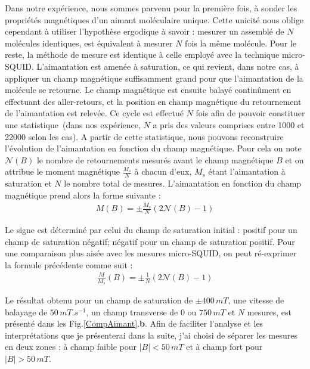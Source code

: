 Dans notre expérience, nous sommes parvenu pour la première fois, à sonder les propriétés magnétiques d'un aimant moléculaire unique. Cette unicité nous oblige cependant à utiliser l'hypothèse ergodique à savoir : mesurer un assemblé de $N$ molécules identiques, est équivalent à mesurer $N$ fois la même molécule. Pour le reste, la méthode de mesure est identique à celle employé avec la technique micro-SQUID. L'aimantation est amenée à saturation, ce qui revient, dans notre cas, à appliquer un champ magnétique suffisamment grand pour que l'aimantation de la molécule se retourne. Le champ magnétique est ensuite balayé continûment en effectuant des aller-retours, et la position en champ magnétique du retournement de l'aimantation est relevée. Ce cycle est effectué $N$ fois afin de pouvoir constituer une statistique~(dans nos expérience, $N$ a pris des valeurs comprises entre 1000 et 22000 selon les cas). A partir de cette statistique, nous pouvons reconstruire l'évolution de l'aimantation en fonction du champ magnétique. Pour cela on note $\mathscr{N}(B)$ le nombre de retournements mesurés avant le champ magnétique $B$ et on attribue le moment magnétique $\frac{M_s}{N}$ à chacun d'eux, $M_s$ étant l'aimantation à saturation et $N$ le nombre total de mesures. L'aimantation en fonction du champ magnétique prend alors la forme suivante :
\begin{eqnarray}
M(B) =\pm \frac{M_s}{N}(2\mathscr{N}(B) -1)\nonumber
\end{eqnarray}

Le signe est déterminé par celui du champ de saturation initial : positif pour un champ de saturation négatif; négatif pour un champ de saturation positif. Pour une comparaison plus aisée avec les mesures micro-SQUID, on peut ré-exprimer la formule précédente comme suit :
\begin{eqnarray}
\frac{M}{M_s}(B) =\pm \frac{1}{N} (2\mathscr{N}(B) -1)
\end{eqnarray}


Le résultat obtenu pour un champ de saturation de $\pm 400 \, mT$, une vitesse de balayage de $50\,mT.s^{-1}$, un champ transverse de $0$ ou $750\,mT$ et $N$ mesures, est présenté dans les Fig.\ref{CompAimant}.\textbf{b}. Afin de faciliter l'analyse et les interprétations que je présenterai dans la suite, j'ai choisi de séparer les mesures en deux zones : à champ faible pour $|B|< 50\,mT$ et à champ fort pour $|B|>50\,mT$.

